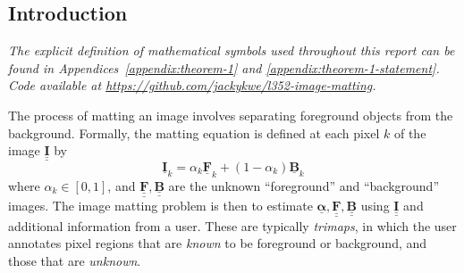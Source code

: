 \documentclass{article}
\theoremstyle{definition}
\def\vt#1{\underline{\mathbf{#1}}}
\def\vts#1{\underline{\boldsymbol{#1}}}
\def\mt#1{\underline{\underline{\mathbf{#1}}}}
\begin{document}
\begin{multicols}{2}[]




\section{Introduction}

\emph{The explicit definition of mathematical symbols used throughout this report can be found in Appendices~\ref{appendix:theorem-1} and \ref{appendix:theorem-1-statement}. Code available at \url{https://github.com/jackykwe/l352-image-matting}.}

The process of matting an image involves separating foreground objects from the background. Formally, the matting equation is defined at each pixel $k$ of the image $\mt I$ by $$\vt I_k = \alpha_{k} \vt F_{k}  + (1-\alpha_k) \vt B_k$$
where $\alpha_{k}\in[0,1]$, and $\mt F, \mt B$ are the unknown ``foreground'' and ``background'' images.   %
The image matting problem is then to estimate $\vts \alpha, \mt F, \mt B$ using $\mt I$ and additional information from a user. These are typically \emph{trimaps}, in which the user annotates pixel regions that are \emph{known} to be foreground or background, and those that are \emph{unknown}.  %


\end{multicols}
\end{document}

